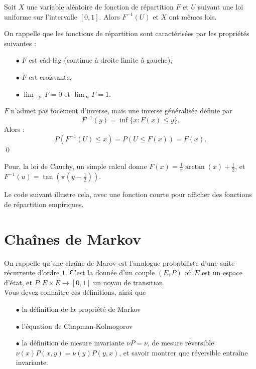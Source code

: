 \begin{lem}
Soit $X$ une variable aléatoire de fonction de répartition $F$ et $U$ suivant une loi uniforme sur l'intervalle $[0,1]$. Alors $F^{-1}(U)$ et $X$ ont mêmes lois.
\end{lem}

\begin{dem}
On rappelle que les fonctions de répartition sont caractérisées par les propriétés suivantes :
\begin{itemize}
\item[$\bullet$] $F$ est càd-làg (continue à droite limite à gauche),
\item[$\bullet$] $F$ est croissante,
\item[$\bullet$] $\lim_{-\infty} F =0$ et $\lim_\infty F =1$.
\end{itemize}
$F$ n'admet pas focément d'inverse, mais une inverse généralisée définie par 
\[F^{-1}(y) = \inf\{x : F(x)\leq y\}.\]
Alors :
\[P(F^{-1}(U)\leq x)= P(U\leq F(x)) = F(x).\]
\qed
\end{dem}
Pour, la loi de Cauchy, un simple calcul donne $F(x)=\frac{1}{\pi}\arctan(x)+\frac{1}{2}$, et $F^{-1}(u)=\tan(\pi(y-\frac{1}{2}))$. 

Le code suivant illustre cela, avec une fonction courte pour afficher des fonctions de répartition empiriques.\\



\section{Chaînes de Markov}

On rappelle qu'une chaîne de Marov est l'analogue probabiliste d'une suite récurrente d'ordre $1$. C'est la donnée d'un couple $(E,P)$ où $E$ est un espace d'état, et $P : E\times E\rightarrow [0,1]$ un noyau de transition.\\

Vous devez connaître ces définitions, ainsi que
\begin{itemize}
\item[$\bullet$] la définition de la propriété de Markov
\item[$\bullet$] l'équation de Chapman-Kolmogorov
\item[$\bullet$] la définition de mesure invariante $\nu P =\nu$, de mesure réversible $\nu(x)P(x,y)=\nu(y)P(y,x)$, et savoir montrer que réversible entraîne invariante.\\
\end{itemize}

